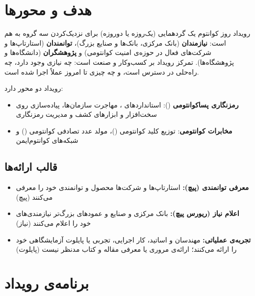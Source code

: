 \documentclass[a4paper,12pt]{article}
\newcommand{\tg}[1]{{\color{mci-gold}\footnotesize(#1)}}
\begin{document}
	\section{هدف و محورها}

	رویداد روز کوانتوم یک گردهمایی (یک‌روزه یا دو‌روزه) برای نزدیک‌کردن سه گروه به هم است:
	\textbf{نیازمندان} (بانک مرکزی، بانک‌ها و صنایع بزرگ)، \textbf{توانمندان} (استارتاپ‌ها و شرکت‌های فعال در حوزه‌ی امنیت کوانتومی) و
	\textbf{پژوهشگران} (دانشگاه‌ها و پژوهشگاه‌ها).
	تمرکز رویداد بر کسب‌وکار و صنعت است: چه نیازی وجود دارد، چه راه‌حلی در دسترس است، و چه چیزی تا امروز عملاً اجرا شده است.

	رویداد دو محور دارد:
	\begin{itemize}[rightmargin=0.5cm, itemsep=3pt]
		\item \textbf{رمزنگاری پساکوانتومی} (): استانداردهای ، مهاجرت سازمان‌ها، پیاده‌سازی روی سخت‌افزار و ابزارهای کشف و مدیریت رمزنگاری
		\item \textbf{مخابرات کوانتومی}: توزیع کلید کوانتومی ()، مولد عدد تصادفی کوانتومی () و شبکه‌های کوانتوم‌ایمن
	\end{itemize}

	\subsection{قالب ارائه‌ها}
	\begin{itemize}[rightmargin=0.5cm, itemsep=3pt]
		\item \textbf{معرفی توانمندی (پیچ):} استارتاپ‌ها و شرکت‌ها محصول و توانمندی خود را معرفی می‌کنند \tg{پیچ}
		\item \textbf{اعلام نیاز (ریورس پیچ):} بانک مرکزی و صنایع و عمودهای بزرگ‌تر نیازمندی‌های خود را اعلام می‌کنند \tg{نیاز}
		\item \textbf{تجربه‌ی عملیاتی:} مهندسان و اساتید، کار اجرایی، تجربی یا پایلوت آزمایشگاهی خود را ارائه می‌کنند؛ ارائه‌ی مروری یا معرفی مقاله و کتاب مدنظر نیست \tg{پایلوت}
	\end{itemize}

	\section{برنامه‌ی رویداد}\label{sec:schedule}
\end{document}
